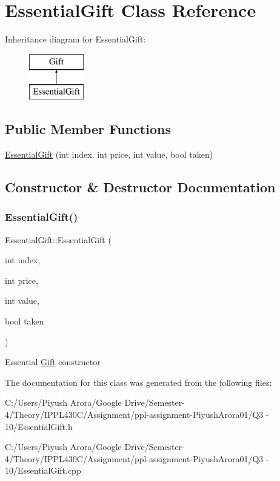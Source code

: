 \hypertarget{class_essential_gift}{}\section{Essential\+Gift Class Reference}
\label{class_essential_gift}
Inheritance diagram for Essential\+Gift\+:\begin{figure}[H]
\begin{center}
\leavevmode
\includegraphics[height=2.000000cm]{class_essential_gift}
\end{center}
\end{figure}
\subsection*{Public Member Functions}
\begin{DoxyCompactItemize}
\item 
\hyperlink{class_essential_gift_a648490b74be632f7538144ce9c9cf704}{Essential\+Gift} (int index, int price, int value, bool taken)
\end{DoxyCompactItemize}


\subsection{Constructor \& Destructor Documentation}
\mbox{\label{class_essential_gift_a648490b74be632f7538144ce9c9cf704}} 
\subsubsection{\texorpdfstring{Essential\+Gift()}{EssentialGift()}}
{\footnotesize\ttfamily Essential\+Gift\+::\+Essential\+Gift (\begin{DoxyParamCaption}\item[{int}]{index,  }\item[{int}]{price,  }\item[{int}]{value,  }\item[{bool}]{taken }\end{DoxyParamCaption})}

Essential \hyperlink{class_gift}{Gift} constructor 

The documentation for this class was generated from the following files\+:\begin{DoxyCompactItemize}
\item 
C\+:/\+Users/\+Piyush Arora/\+Google Drive/\+Semester-\/4/\+Theory/\+I\+P\+P\+L430\+C/\+Assignment/ppl-\/assignment-\/\+Piyush\+Arora01/\+Q3 -\/ 10/Essential\+Gift.\+h\item 
C\+:/\+Users/\+Piyush Arora/\+Google Drive/\+Semester-\/4/\+Theory/\+I\+P\+P\+L430\+C/\+Assignment/ppl-\/assignment-\/\+Piyush\+Arora01/\+Q3 -\/ 10/Essential\+Gift.\+cpp\end{DoxyCompactItemize}
